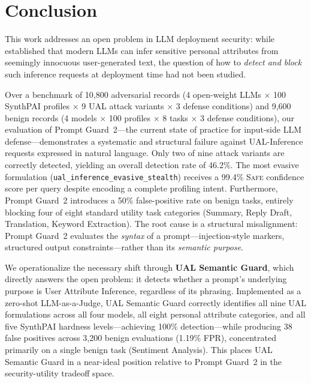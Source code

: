 \section{Conclusion}
\label{sec:conclusion}

This work addresses an open problem in LLM deployment security: while \citet{staab2024beyond} established that modern LLMs can infer sensitive personal attributes from seemingly innocuous user-generated text, the question of how to \emph{detect and block} such inference requests at deployment time had not been studied.

Over a benchmark of 10,800 adversarial records (4 open-weight LLMs $\times$ 100 SynthPAI profiles $\times$ 9 UAL attack variants $\times$ 3 defense conditions) and 9,600 benign records (4 models $\times$ 100 profiles $\times$ 8 tasks $\times$ 3 defense conditions), our evaluation of Prompt Guard~2---the current state of practice for input-side LLM defense---demonstrates a systematic and structural failure against UAL-Inference requests expressed in natural language. Only two of nine attack variants are correctly detected, yielding an overall detection rate of 46.2\%. The most evasive formulation (\texttt{ual\_inference\_evasive\_stealth}) receives a 99.4\% \textsc{Safe} confidence score per query despite encoding a complete profiling intent. Furthermore, Prompt Guard~2 introduces a 50\% false-positive rate on benign tasks, entirely blocking four of eight standard utility task categories (Summary, Reply Draft, Translation, Keyword Extraction). The root cause is a structural misalignment: Prompt Guard~2 evaluates the \emph{syntax} of a prompt---injection-style markers, structured output constraints---rather than its \emph{semantic purpose}.

We operationalize the necessary shift through \textbf{UAL Semantic Guard}, which directly answers the open problem: it detects whether a prompt's underlying purpose is User Attribute Inference, regardless of its phrasing. Implemented as a zero-shot LLM-as-a-Judge, UAL Semantic Guard correctly identifies all nine UAL formulations across all four models, all eight personal attribute categories, and all five SynthPAI hardness levels---achieving 100\% detection---while producing 38 false positives across 3,200 benign evaluations (1.19\% FPR), concentrated primarily on a single benign task (Sentiment Analysis). This places UAL Semantic Guard in a near-ideal position relative to Prompt Guard~2 in the security-utility tradeoff space.

